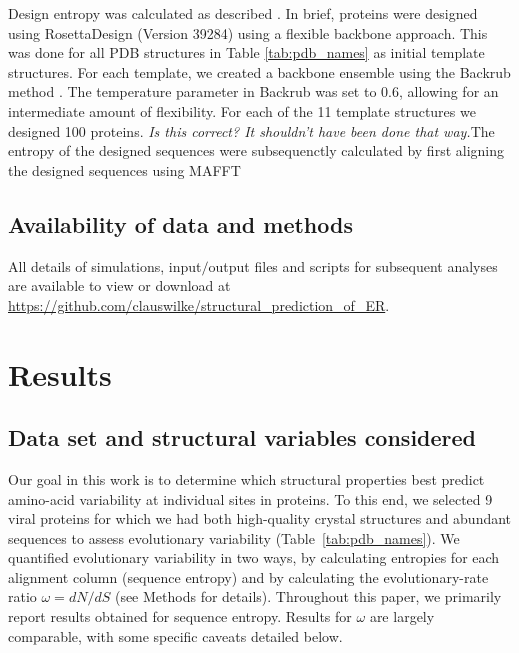 \documentclass[12pt]{article}
\begin{document}
Design entropy was calculated as described \citep{Jacksonetal2013}. In brief, proteins were designed using RosettaDesign (Version 39284) \citep{leaver-fay_rosetta3:_2011} using a flexible backbone approach. This was done for all PDB structures in Table \ref{tab:pdb_names} as initial template structures. For each template, we created a backbone ensemble using the Backrub method \citep{smith_backrub-like_2008}. The temperature parameter in Backrub was set to 0.6, allowing for an intermediate amount of flexibility.  For each of the 11 template structures we designed 100 proteins. {\color{red}\emph{Is this correct? It shouldn't have been done that way.}The entropy of the designed sequences were subsequenctly calculated by first aligning the designed sequences using MAFFT}

\subsection*{Availability of data and methods}

All details of simulations, input$/$output files and scripts for subsequent analyses are available to view or download at \url{https://github.com/clauswilke/structural\_prediction\_of\_ER}.

\section*{Results}

\subsection*{Data set and structural variables considered}

Our goal in this work is to determine which structural properties best predict amino-acid variability at individual sites in proteins. To this end, we selected 9 viral proteins for which we had both high-quality crystal structures and abundant sequences to assess evolutionary variability (Table~\ref{tab:pdb_names}). We quantified evolutionary variability in two ways, by calculating entropies for each alignment column (sequence entropy) and by calculating the evolutionary-rate ratio $\omega=dN/dS$ (see Methods for details). Throughout this paper, we primarily report results obtained for sequence entropy. Results for $\omega$ are largely comparable, with some specific caveats detailed below.
\end{document}
